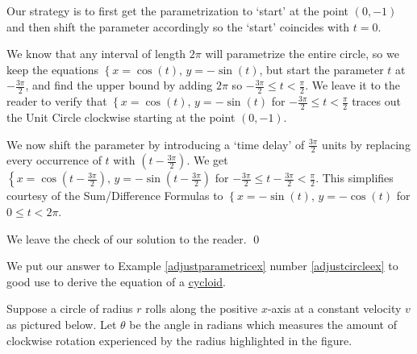 \begin{ex}
\begin{enumerate}
\smallskip

Our strategy is to first get the parametrization to `start' at the point $(0,-1)$ and then shift the parameter accordingly so the `start' coincides with $t = 0$.  

\smallskip

We know that any interval of length $2\pi$ will parametrize the entire circle, so we keep the equations $\left\{ x = \cos(t), \, y = -\sin(t) \right.$, but start the parameter $t$ at $-\frac{3\pi}{2}$, and find the upper bound by adding $2\pi$ so $-\frac{3\pi}{2} \leq t < \frac{\pi}{2}$.  We leave it to the reader to  verify that   $\left\{ x = \cos(t), \, y = -\sin(t) \right.$ for $-\frac{3\pi}{2} \leq t < \frac{\pi}{2}$ traces out the Unit Circle clockwise starting at the point $(0, -1)$.  

\smallskip

We now shift the parameter by introducing a `time delay' of $\frac{3\pi}{2}$ units by replacing every occurrence of $t$ with $\left(t - \frac{3\pi}{2}\right)$.  We get $\left\{ x = \cos\left(t - \frac{3\pi}{2}\right), \, y = -\sin\left(t - \frac{3\pi}{2}\right) \right.$ for  $-\frac{3\pi}{2} \leq t - \frac{3\pi}{2} < \frac{\pi}{2}$.  This simplifies courtesy of the Sum/Difference Formulas to $\left\{ x = -\sin(t), \, y = -\cos(t) \right.$ for $ 0 \leq t  < 2\pi$.

\smallskip

We leave the check of our solution to the reader.  \qed

\end{enumerate}

\end{ex}

We put our answer to Example \ref{adjustparametricex} number \ref{adjustcircleex} to good use to derive the equation of a  \href{http://en.wikipedia.org/wiki/Cycloid}{\underline{cycloid}}. 

\smallskip

 Suppose a circle of radius $r$ rolls along the positive $x$-axis at a constant velocity $v$ as pictured below.  Let $\theta$ be the angle in radians which measures the amount of clockwise rotation experienced by the radius highlighted in the figure.  

